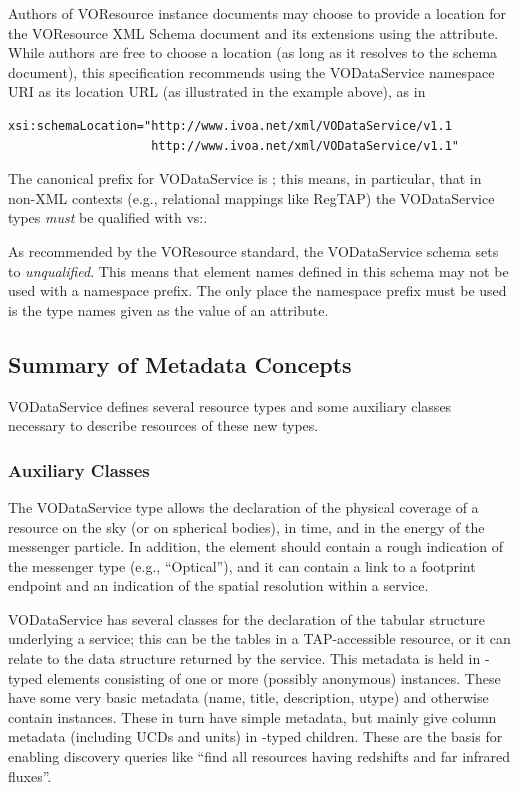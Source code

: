 \documentclass[11pt,a4paper]{ivoa}
\begin{document}
Authors of VOResource instance documents may choose to
provide a location for the VOResource XML Schema document and its
extensions using the
 attribute.  While authors are free to
choose a location (as long as it resolves to the schema document), this
specification
recommends using the VODataService namespace URI as its location URL
(as illustrated in the example above), as in
\begin{verbatim}
xsi:schemaLocation="http://www.ivoa.net/xml/VODataService/v1.1
                    http://www.ivoa.net/xml/VODataService/v1.1"
\end{verbatim}

The canonical prefix for VODataService is ; this means, in
particular, that in non-XML contexts (e.g., relational mappings
like RegTAP) the VODataService types \emph{must} be qualified with
vs:.

As recommended by the VOResource standard, the
VODataService schema sets  to \emph{unqualified}.
This means that element names defined
in this schema may not be used with a namespace prefix.
The only place the namespace prefix must be used is the
type names given as the value of an
 attribute.


\subsection{Summary of Metadata Concepts}
\label{sect:summ}


VODataService defines several resource types and some auxiliary classes
necessary to describe resources of these new types.

\subsubsection{Auxiliary Classes}

The VODataService type  allows the declaration of
the physical coverage of a resource on the sky (or on spherical bodies),
in time, and in the energy of the messenger particle.  In addition, the
element should contain a rough indication of the messenger type
(e.g., ``Optical''), and it can contain a link to a footprint endpoint and an
indication of the spatial resolution within a service.

VODataService has several classes for the declaration of the tabular
structure underlying a service; this can be the tables in a
TAP-accessible resource,
or it can relate to the data structure returned by the service.  This
metadata is held in
-typed elements consisting
of one or more (possibly anonymous)
 instances.  These have some very basic metadata
(name, title, description, utype) and otherwise contain 
instances.  These in turn have simple metadata, but mainly give column
metadata (including UCDs and units) in -typed
children.  These are the basis for enabling discovery queries like
``find all resources having redshifts and far infrared fluxes''.
\end{document}
